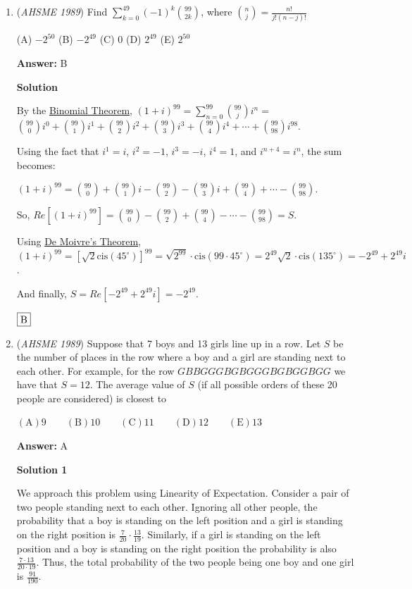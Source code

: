 \begin{enumerate}
	\item (\textit{AHSME 1989}) Find $\sum_{k=0}^{49}(-1)^k\binom{99}{2k}$, where $\binom{n}{j}=\frac{n!}{j!(n-j)!}$


 (A) $-2^{50}$ (B) $-2^{49}$ (C) 0 (D) $2^{49}$ (E) $2^{50}$

 \textbf{Answer: }B



\textbf{Solution}

By the \href{https://artofproblemsolving.com/wiki/index.php?title=Binomial\_Theorem}{Binomial Theorem}, $(1+i)^{99}=\sum_{n=0}^{99}\binom{99}{j}i^n =$ $\binom{99}{0}i^0+\binom{99}{1}i^1+\binom{99}{2}i^2+\binom{99}{3}i^3+\binom{99}{4}i^4+\cdots +\binom{99}{98}i^{98}$. 

 Using the fact that $i^1=i$, $i^2=-1$, $i^3=-i$, $i^4=1$, and $i^{n+4}=i^n$, the sum becomes: 

 $(1+i)^{99}=\binom{99}{0}+\binom{99}{1}i-\binom{99}{2}-\binom{99}{3}i+\binom{99}{4}+\cdots -\binom{99}{98}$. 

 So, $Re[(1+i)^{99}]=\binom{99}{0}-\binom{99}{2}+\binom{99}{4}-\cdots -\binom{99}{98} = S$. 

 Using \href{https://artofproblemsolving.com/wiki/index.php?title=De\_Moivre\%27s\_Theorem}{De Moivre's Theorem}, $(1+i)^{99}=[\sqrt{2}\mathrm{cis}(45^\circ)]^{99}=\sqrt{2^{99}}\cdot \mathrm{cis}(99\cdot45^\circ)=2^{49}\sqrt{2}\cdot \mathrm{cis}(135^\circ) = -2^{49}+2^{49}i$. 

 And finally, $S=Re[-2^{49}+2^{49}i] = -2^{49}$.

 $\fbox{B}$



	\item (\textit{AHSME 1989}) Suppose that 7 boys and 13 girls line up in a row. Let $S$ be the number of places in the row where a boy and a girl are standing next to each other. For example, for the row $GBBGGGBGBGGGBGBGGBGG$ we have that $S=12$. The average value of $S$ (if all possible orders of these 20 people are considered) is closest to


 $\mathrm{(A) 9 } \qquad \mathrm{(B) 10 } \qquad \mathrm{(C) 11 } \qquad \mathrm{(D) 12 } \qquad \mathrm{(E) 13 }$

 \textbf{Answer: }A



\textbf{Solution 1}

We approach this problem using Linearity of Expectation. Consider a pair of two people standing next to each other. Ignoring all other people, the probability that a boy is standing on the left position and a girl is standing on the right position is $\frac7{20}\cdot\frac{13}{19}$. Similarly, if a girl is standing on the left position and a boy is standing on the right position the probability is also $\frac{7\cdot 13}{20\cdot 19}$. Thus, the total probability of the two people being one boy and one girl is $\frac{91}{190}$.


\end{enumerate}
